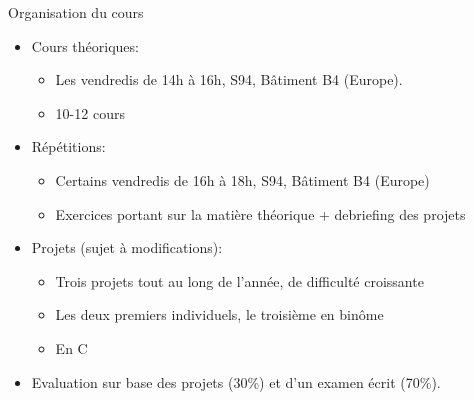 \begin{frame}{Organisation du cours}
\begin{itemize}
\item Cours théoriques:
\begin{itemize}
\item Les vendredis de 14h à 16h, S94, Bâtiment B4 (Europe).
\item 10-12 cours
\end{itemize}
\item Répétitions:
\begin{itemize}
\item Certains vendredis de 16h à 18h, S94, Bâtiment B4 (Europe)
\item Exercices portant sur la matière théorique + debriefing des projets
\end{itemize}
\item Projets (sujet à modifications):
\begin{itemize}
\item Trois projets tout au long de l'année, de difficulté croissante
\item Les deux premiers individuels, le troisième en binôme
\item En C
\end{itemize}

\bigskip
\item Evaluation sur base des projets (30\%) et d'un examen écrit (70\%).
\end{itemize}
\end{frame}


